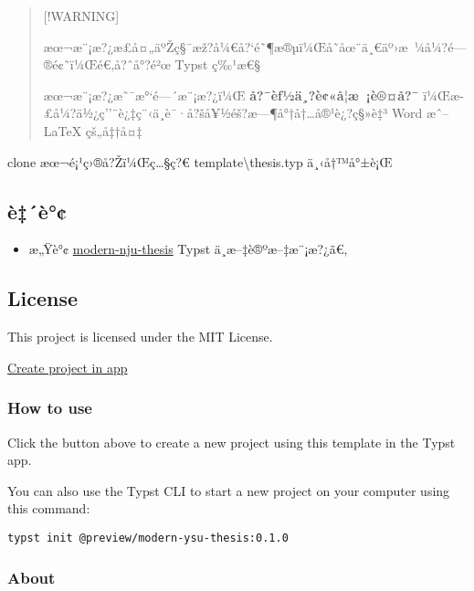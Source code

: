 \begin{quote}
{[}!WARNING{]}

æœ¬æ¨¡æ?¿æ­£å¤„äºŽç§¯æž?å¼€å?{}`é˜¶æ®µï¼Œå­˜åœ¨ä¸€äº›æ~¼å¼?é---®é¢˜ï¼Œé€‚å?ˆå°?é²œ
Typst ç‰¹æ€§

æœ¬æ¨¡æ?¿æ˜¯æ°`é---´æ¨¡æ?¿ï¼Œ \textbf{å?¯èƒ½ä¸?è¢«å­¦æ~¡è®¤å?¯}
ï¼Œæ­£å¼?ä½¿ç''¨è¿‡ç¨‹ä¸­è¯·å?šå¥½éš?æ---¶å°†å†\ldots å®¹è¿?ç§»è‡³ Word
æˆ-- LaTeX çš„å‡†å¤‡
\end{quote}

clone æœ¬é¡¹ç›®å?Žï¼Œç\ldots§ç?€ template\textbackslash thesis.typ
ä¸‹å†™å°±è¡Œ

\subsection{è‡´è°¢}\label{uxe8uxe8}

\begin{itemize}
\tightlist
\item
  æ„Ÿè°¢
  \href{https://github.com/nju-lug/modern-nju-thesis}{modern-nju-thesis}
  Typst ä¸­æ--‡è®ºæ--‡æ¨¡æ?¿ã€‚
\end{itemize}

\subsection{License}\label{license}

This project is licensed under the MIT License.

\href{/app?template=modern-ysu-thesis&version=0.1.0}{Create project in
app}

\subsubsection{How to use}\label{how-to-use}

Click the button above to create a new project using this template in
the Typst app.

You can also use the Typst CLI to start a new project on your computer
using this command:

\begin{verbatim}
typst init @preview/modern-ysu-thesis:0.1.0
\end{verbatim}



\subsubsection{About}\label{about}

